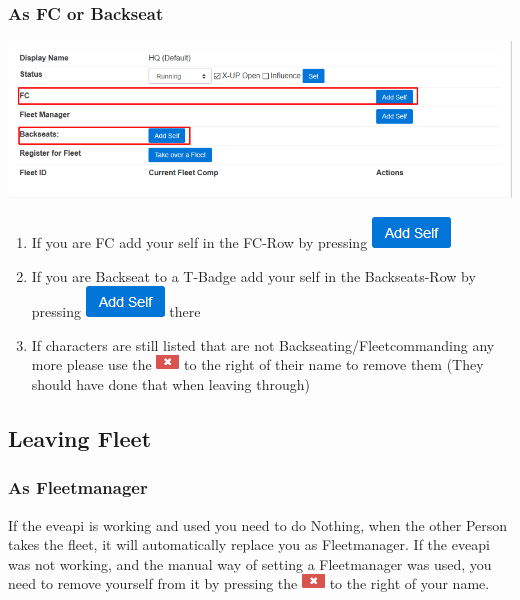 \documentclass[oneside,a4paper]{article}
\newcommand{\piccross}{\includegraphics{cross.png}\xspace}
\begin{document}
\subsubsection{As FC or Backseat}
\includegraphics[width=\textwidth]{takeover-fc.png}
\begin{enumerate}
	\item If you are FC add your self in the FC-Row by pressing \includegraphics[scale=0.5]{add-self.png}
	\item If you are Backseat to a T-Badge add your self in the Backseats-Row by pressing \includegraphics[scale=0.5]{add-self.png} there
	\item If characters are still listed that are not Backseating/Fleetcommanding any more please use the \piccross to the right of their name to remove them (They should have done that when leaving through)
\end{enumerate}

\subsection{Leaving Fleet}
\subsubsection{As Fleetmanager}
If the eveapi is working and used you need to do Nothing, when the other Person takes the fleet, it will automatically replace you as Fleetmanager.
If the eveapi was not working, and the manual way of setting a Fleetmanager was used, you need to remove yourself from it by pressing the \piccross to the right of your name.
\end{document}
